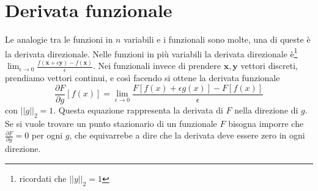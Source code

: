 \documentclass[11pt,a4paper]{report}
\theoremstyle{definition}
\theoremstyle{plain}
\theoremstyle{plain}
\begin{document}
		\section{Derivata funzionale}
			Le analogie tra le funzioni in $n$ variabili e i funzionali sono molte, una di queste è la derivata direzionale.\newline
			Nelle funzioni in più variabili la derivata direzionale è\footnote{ricordati che $||y||_2=1$} $\lim_{\epsilon \to 0}\frac{f(\mathbf{x}+\epsilon\mathbf{y})-f(\mathbf{x})}{\epsilon}$. Nei funzionali invece di prendere $\mathbf{x},\mathbf{y}$ vettori discreti, prendiamo vettori continui, e così facendo si ottene la derivata funzionale
			\begin{equation}
				\frac{\partial F}{\partial g}[f(x)]=\lim_{\epsilon \to 0}\frac{F[f(x)+\epsilon g(x)]-F[f(x)]}{\epsilon}
			\end{equation}
			con $||g||_2=1$. Questa equazione rappresenta la derivata di $F$ nella direzione di $g$.\newline
			Se si vuole trovare un punto stazionario di un funzionale $F$ bisogna imporre che $\frac{\partial F}{\partial g}=0$ per ogni $g$, che equivarrebe a dire che la derivata deve essere zero in ogni direzione.\newline
\end{document}
